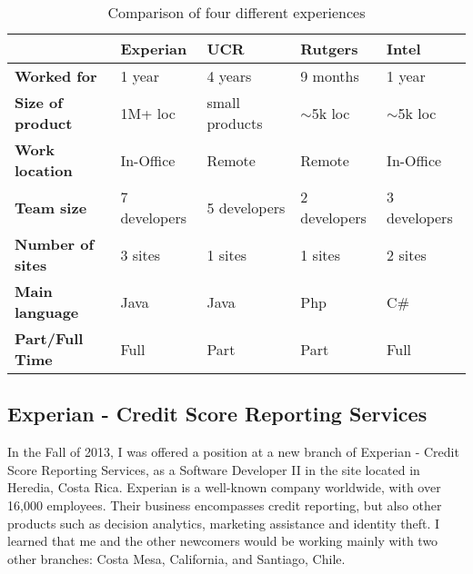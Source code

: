 \documentclass[12pt, letterpaper]{article}
\begin{document}
\begin{table}[] 
\centering
\caption{Comparison of four different experiences}
\label{comparisonTable}
\begin{tabular}{lllll}
\hline
                         & \textbf{Experian}      & \textbf{UCR}   & \textbf{Rutgers} & \textbf{Intel} \\ \hline
                         
\textbf{Worked for}      & 1 year                 & 4 years        & 9 months         & 1 year         \\ 
\textbf{Size of product} & 1M+ loc                & small products & $\sim$5k loc     & $\sim$5k loc   \\ 
\textbf{Work location}   & In-Office              & Remote         & Remote           & In-Office      \\ 
\textbf{Team size}       & 7 developers           & 5 developers   & 2 developers     & 3 developers   \\ 
\textbf{Number of sites} & 3 sites                & 1 sites        & 1 sites          & 2 sites        \\ 
\textbf{Main language}   & Java                   & Java           & Php              & C\#            \\ 
\textbf{Part/Full Time}  & Full                   & Part           & Part             & Full           \\ \hline
\end{tabular}
\end{table}

\subsection{Experian - Credit Score Reporting Services}
In the Fall of 2013, I was offered a position at a new branch of Experian - Credit Score Reporting Services, as a Software Developer II in the site located in Heredia, Costa Rica.
Experian is a well-known company worldwide, with over 16,000
employees. Their business encompasses credit reporting, but also other products such as decision 
analytics, marketing assistance and identity theft. I learned that me and 
the other newcomers would be working mainly with two other branches: 
Costa Mesa, California, and Santiago, Chile. 
\end{document}
